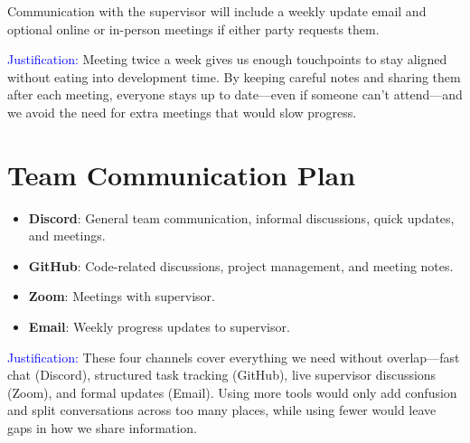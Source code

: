 \documentclass{article}
\begin{document}
Communication with the supervisor will include a weekly update email and
optional online or in-person meetings if either party requests them.

\textcolor{blue}{Justification:} Meeting twice a week gives us enough touchpoints
to stay aligned without eating into development time. By keeping careful notes
and sharing them after each meeting, everyone stays up to date—even if someone
can’t attend—and we avoid the need for extra meetings that would slow progress.






\section{Team Communication Plan}

\begin{itemize}
  \item \textbf{Discord}: General team communication, informal discussions, quick updates, and meetings.
  \item \textbf{GitHub}: Code-related discussions, project management, and meeting notes.
  \item \textbf{Zoom}: Meetings with supervisor.
  \item \textbf{Email}: Weekly progress updates to supervisor.

\end{itemize}

\textcolor{blue}{Justification:} These four channels cover everything we need without
overlap—fast chat (Discord), structured task tracking (GitHub), live supervisor
discussions (Zoom), and formal updates (Email). Using more tools would only add
confusion and split conversations across too many places, while using fewer
would leave gaps in how we share information.

\end{document}
